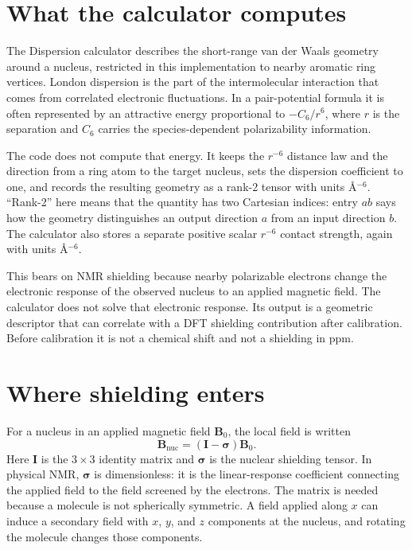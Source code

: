 \documentclass[11pt]{article}
\begin{document}

\section{What the calculator computes}

The Dispersion calculator describes the short-range van der Waals geometry
around a nucleus, restricted in this implementation to nearby aromatic ring
vertices. London dispersion is the part of the intermolecular interaction that
comes from correlated electronic fluctuations. In a pair-potential formula it
is often represented by an attractive energy proportional to
\(-C_6/r^6\), where \(r\) is the separation and \(C_6\) carries the
species-dependent polarizability information.

The code does not compute that energy. It keeps the \(r^{-6}\) distance law
and the direction from a ring atom to the target nucleus, sets the dispersion
coefficient to one, and records the resulting geometry as a rank-2 tensor with
units \(\si{\angstrom^{-6}}\). ``Rank-2'' here means that the quantity has two
Cartesian indices: entry \(ab\) says how the geometry distinguishes an output
direction \(a\) from an input direction \(b\). The calculator also stores a
separate positive scalar \(r^{-6}\) contact strength, again with units
\(\si{\angstrom^{-6}}\).

This bears on NMR shielding because nearby polarizable electrons change the
electronic response of the observed nucleus to an applied magnetic field. The
calculator does not solve that electronic response. Its output is a geometric
descriptor that can correlate with a DFT shielding contribution after
calibration. Before calibration it is not a chemical shift and not a shielding
in ppm.

\section{Where shielding enters}

For a nucleus in an applied magnetic field \(\bm B_0\), the local field is
written
\begin{equation}
  \bm B_{\mathrm{nuc}} = (\bm I-\bm\sigma)\bm B_0 .
  \label{eq:shielding}
\end{equation}
Here \(\bm I\) is the \(3\times3\) identity matrix and \(\bm\sigma\) is the
nuclear shielding tensor. In physical NMR, \(\bm\sigma\) is dimensionless: it
is the linear-response coefficient connecting the applied field to the field
screened by the electrons. The matrix is needed because a molecule is not
spherically symmetric. A field applied along \(x\) can induce a secondary field
with \(x\), \(y\), and \(z\) components at the nucleus, and rotating the
molecule changes those components.
\end{document}
